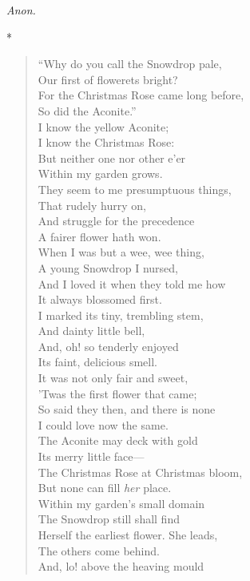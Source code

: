 \documentclass[11pt,twoside]{article}
\newcommand\stars{\begin{center}*\quad*\quad*\end{center}}
\newcommand\by[1]{\par\hfill\textit{#1}\par}
\begin{document}
\by{Anon.}

\stars

\begin{verse}
“Why do you call the Snowdrop pale,\\
\quad Our first of flowerets bright?\\
For the Christmas Rose came long before,\\
\quad So did the Aconite.”\\
I know the yellow Aconite;\\
\quad I know the Christmas Rose:\\
But neither one nor other e’er\\
\quad Within my garden grows.\\
They seem to me presumptuous things,\\
\quad That rudely hurry on,\\
And struggle for the precedence\\
\quad A fairer flower hath won.\\
When I was but a wee, wee thing,\\
\quad A young Snowdrop I nursed,\\
And I loved it when they told me how\\
\quad It always blossomed first.\\
I marked its tiny, trembling stem,\\
\quad And dainty little bell,\\
And, oh! so tenderly enjoyed\\
\quad Its faint, delicious smell.\\
It was not only fair and sweet,\\
\quad ’Twas the first flower that came;\\
So said they then, and there is none\\
\quad I could love now the same.\\
The Aconite may deck with gold\\
\quad Its merry little face---\\
The Christmas Rose at Christmas bloom,\\
\quad But none can fill \emph{her} place.\\
Within my garden’s small domain\\
\quad The Snowdrop still shall find\\
Herself the earliest flower. She leads,\\
\quad The others come behind.\\
And, lo! above the heaving mould\\

\end{verse}
\end{document}
